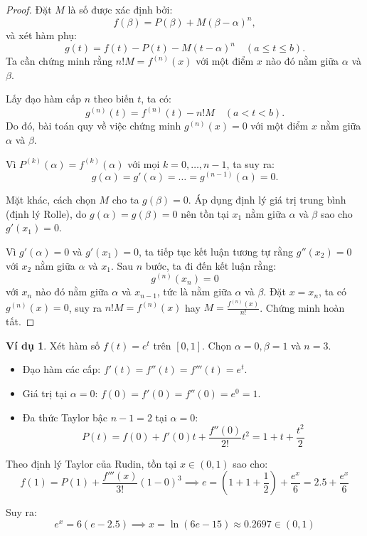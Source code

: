 \documentclass[12pt]{article}
\theoremstyle{definition}
\newtheorem*{example}{Ví dụ}
\theoremstyle{remark}
\begin{document}
\begin{proof}
Đặt $M$ là số được xác định bởi:
\begin{equation}
f(\beta) = P(\beta) + M(\beta - \alpha)^n,
\end{equation}
và xét hàm phụ:
\begin{equation}
g(t) = f(t) - P(t) - M(t - \alpha)^n \quad (a \le t \le b).
\end{equation}
Ta cần chứng minh rằng $n!M = f^{(n)}(x)$ với một điểm $x$ nào đó nằm giữa $\alpha$ và $\beta$. 

Lấy đạo hàm cấp $n$ theo biến $t$, ta có:
\begin{equation}
g^{(n)}(t) = f^{(n)}(t) - n!M \quad (a < t < b).
\end{equation}
Do đó, bài toán quy về việc chứng minh $g^{(n)}(x) = 0$ với một điểm $x$ nằm giữa $\alpha$ và $\beta$.

Vì $P^{(k)}(\alpha) = f^{(k)}(\alpha)$ với mọi $k = 0, \dots, n-1$, ta suy ra:
\begin{equation}
g(\alpha) = g'(\alpha) = \dots = g^{(n-1)}(\alpha) = 0.
\end{equation}

Mặt khác, cách chọn $M$ cho ta $g(\beta) = 0$. Áp dụng định lý giá trị trung bình (định lý Rolle), do $g(\alpha) = g(\beta) = 0$ nên tồn tại $x_1$ nằm giữa $\alpha$ và $\beta$ sao cho $g'(x_1) = 0$. 

Vì $g'(\alpha) = 0$ và $g'(x_1) = 0$, ta tiếp tục kết luận tương tự rằng $g''(x_2) = 0$ với $x_2$ nằm giữa $\alpha$ và $x_1$. Sau $n$ bước, ta đi đến kết luận rằng:
\[
g^{(n)}(x_n) = 0
\]
với $x_n$ nào đó nằm giữa $\alpha$ và $x_{n-1}$, tức là nằm giữa $\alpha$ và $\beta$. Đặt $x = x_n$, ta có $g^{(n)}(x) = 0$, suy ra $n!M = f^{(n)}(x)$ hay $M = \frac{f^{(n)}(x)}{n!}$. Chứng minh hoàn tất.
\end{proof}
\begin{example}
Xét hàm số $f(t) = e^t$ trên $[0, 1]$. Chọn $\alpha = 0, \beta = 1$ và $n = 3$.

\begin{itemize}
    \item Đạo hàm các cấp: $f'(t) = f''(t) = f'''(t) = e^t$.
    \item Giá trị tại $\alpha = 0$: $f(0) = f'(0) = f''(0) = e^0 = 1$.
    \item Đa thức Taylor bậc $n - 1 = 2$ tại $\alpha = 0$:
    \[
    P(t) = f(0) + f'(0)t + \frac{f''(0)}{2!}t^2 = 1 + t + \frac{t^2}{2}
    \]
\end{itemize}

Theo định lý Taylor của Rudin, tồn tại $x \in (0, 1)$ sao cho:
\[
f(1) = P(1) + \frac{f'''(x)}{3!}(1 - 0)^3 \implies e = \left(1 + 1 + \frac{1}{2}\right) + \frac{e^x}{6} = 2.5 + \frac{e^x}{6}
\]

Suy ra:
\[
e^x = 6(e - 2.5) \implies x = \ln\left(6e - 15\right) \approx 0.2697 \in (0, 1)
\]
\end{example}
\end{document}
